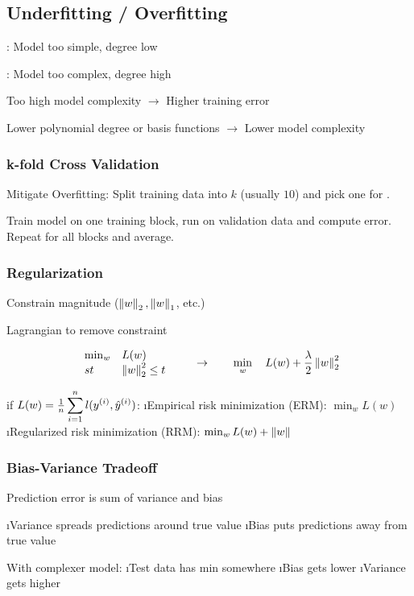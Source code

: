 \subsection{Underfitting / Overfitting}

: Model too simple, degree low

: Model too complex, degree high

Too high model complexity $\to$ Higher training error

Lower polynomial degree or basis functions $\to$ Lower model complexity

\subsubsection{k-fold Cross Validation}

Mitigate Overfitting: Split training data into $k$ (usually $10$) and pick one for .

Train model on one training block, run on validation data and compute error. Repeat for all blocks and average.

\subsubsection{Regularization}

Constrain magnitude ($\left\lVert w\right\rVert_2, \left\lVert w\right\rVert_1$, etc.)

Lagrangian to remove constraint

\[
\begin{array}{ll}
  \min_w & L(w) \\
  st & \left\lVert w\right\rVert_2^2 \leq t
\end{array} \qquad \to \qquad \min_w \quad L(w) + \frac{\lambda}{2} \left\lVert w\right\rVert_2^2
\]

if $L(w) = \frac{1}{n} \displaystyle\sum^n_{{i}=1} l(y^{(i)}, \hat y^{(i)})$:
\be
\i Empirical risk minimization (ERM): \qquad $\min_w L(w)$
\i Regularized risk minimization (RRM): \quad $\min_w L(w) + \left\lVert w\right\rVert$
\ee

\subsubsection{Bias-Variance Tradeoff}

Prediction error is sum of variance and bias

\bi
\i Variance spreads predictions around true value
\i Bias puts predictions away from true value
\ei

With complexer model:
\be
\i Test data has min somewhere
\i Bias gets lower
\i Variance gets higher
\ee

